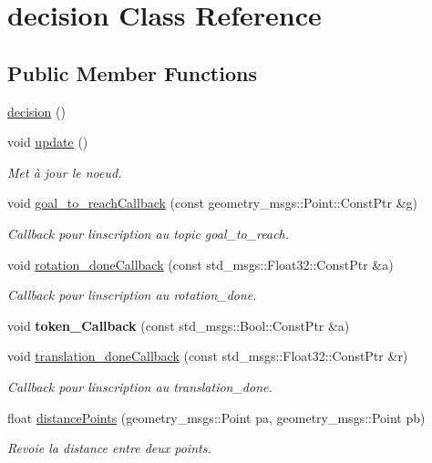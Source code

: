 \hypertarget{classdecision}{}\section{decision Class Reference}
\label{classdecision}
\subsection*{Public Member Functions}
\begin{DoxyCompactItemize}
\item 
\hyperlink{classdecision_a00772c969f42d590e57f3eb37bafe6a6}{decision} ()
\item 
void \hyperlink{classdecision_a5fbd0cdaffc906d31560227560136b59}{update} ()\hypertarget{classdecision_a5fbd0cdaffc906d31560227560136b59}{}\label{classdecision_a5fbd0cdaffc906d31560227560136b59}

\begin{DoxyCompactList}\small\item\em Met à jour le noeud. \end{DoxyCompactList}\item 
void \hyperlink{classdecision_afddf261c387d28dde5e6881343518ca7}{goal\+\_\+to\+\_\+reach\+Callback} (const geometry\+\_\+msgs\+::\+Point\+::\+Const\+Ptr \&g)
\begin{DoxyCompactList}\small\item\em Callback pour l\textquotesingle{}inscription au topic goal\+\_\+to\+\_\+reach. \end{DoxyCompactList}\item 
void \hyperlink{classdecision_ad6c2257e2304ad3a078d2b64cf425caa}{rotation\+\_\+done\+Callback} (const std\+\_\+msgs\+::\+Float32\+::\+Const\+Ptr \&a)
\begin{DoxyCompactList}\small\item\em Callback pour l\textquotesingle{}inscription au rotation\+\_\+done. \end{DoxyCompactList}\item 
void {\bfseries token\+\_\+\+Callback} (const std\+\_\+msgs\+::\+Bool\+::\+Const\+Ptr \&a)\hypertarget{classdecision_a7e0da40a27e1c320329a5b81f6044c57}{}\label{classdecision_a7e0da40a27e1c320329a5b81f6044c57}

\item 
void \hyperlink{classdecision_ab874f222aac437a05fe8bc8c5d8963b4}{translation\+\_\+done\+Callback} (const std\+\_\+msgs\+::\+Float32\+::\+Const\+Ptr \&r)
\begin{DoxyCompactList}\small\item\em Callback pour l\textquotesingle{}inscription au translation\+\_\+done. \end{DoxyCompactList}\item 
float \hyperlink{classdecision_a1b6988efc70e0a25ddb7be0f372d2ad2}{distance\+Points} (geometry\+\_\+msgs\+::\+Point pa, geometry\+\_\+msgs\+::\+Point pb)
\begin{DoxyCompactList}\small\item\em Revoie la distance entre deux points. \end{DoxyCompactList}\end{DoxyCompactItemize}


